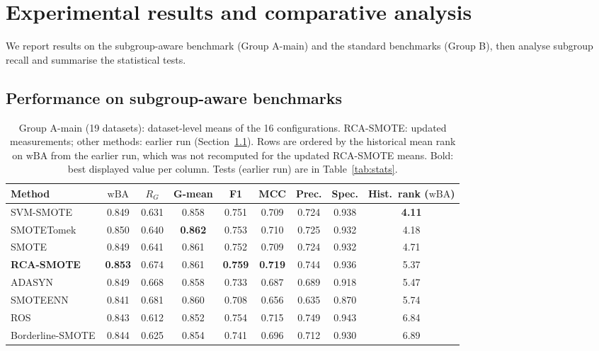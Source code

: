 \documentclass[preprint,nopreprintline]{elsarticle}
\theoremstyle{plain}
\theoremstyle{definition}
\newcommand{\wba}{\mathrm{wBA}}
\newcommand{\rg}{R_{G}}
\newcommand{\tabfont}{\fontsize{8}{9.4}\selectfont}
\begin{document}
\section{Experimental results and comparative analysis}\label{sec:results}

We report results on the subgroup-aware benchmark (Group A-main) and the standard benchmarks (Group B), then analyse subgroup recall and summarise the statistical tests.

\subsection{Performance on subgroup-aware benchmarks}\label{sec:resA}

\begin{table}[!htb]
\caption{Group A-main (19 datasets): dataset-level means of the 16 configurations. RCA-SMOTE: updated measurements; other methods: earlier run (Section~\ref{sec:resA}). Rows are ordered by the historical mean rank on $\wba$ from the earlier run, which was not recomputed for the updated RCA-SMOTE means. Bold: best displayed value per column. Tests (earlier run) are in Table~\ref{tab:stats}.}\label{tab:groupA}
\centering\tabfont
\setlength{\tabcolsep}{4.2pt}
\begin{adjustbox}{max width=\textwidth}
\begin{tabular}{@{}lcccccccc@{}}
\toprule
Method & $\wba$ & $\rg$ & G-mean & F1 & MCC & Prec. & Spec. & Hist.\ rank ($\wba$) \\
\midrule
SVM-SMOTE & 0.849 & 0.631 & 0.858 & 0.751 & 0.709 & 0.724 & 0.938 & \textbf{4.11} \\
SMOTETomek & 0.850 & 0.640 & \textbf{0.862} & 0.753 & 0.710 & 0.725 & 0.932 & 4.18 \\
SMOTE & 0.849 & 0.641 & 0.861 & 0.752 & 0.709 & 0.724 & 0.932 & 4.71 \\
\textbf{RCA-SMOTE} & \textbf{0.853} & 0.674 & 0.861 & \textbf{0.759} & \textbf{0.719} & 0.744 & 0.936 & 5.37 \\
ADASYN & 0.849 & 0.668 & 0.858 & 0.733 & 0.687 & 0.689 & 0.918 & 5.47 \\
SMOTEENN & 0.841 & 0.681 & 0.860 & 0.708 & 0.656 & 0.635 & 0.870 & 5.74 \\
ROS & 0.843 & 0.612 & 0.852 & 0.754 & 0.715 & 0.749 & 0.943 & 6.84 \\
Borderline-SMOTE & 0.844 & 0.625 & 0.854 & 0.741 & 0.696 & 0.712 & 0.930 & 6.89 \\

\end{tabular}
\end{adjustbox}
\end{table}
\end{document}
